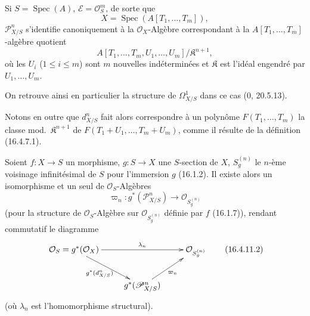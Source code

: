 \begin{corollary}[16.4.10]
\label{IV.16.4.10}
Si $S=\operatorname{Spec}(A)$, $\mathscr{E}=\mathcal{O}_S^m$, de sorte que
\[
  X=\operatorname{Spec}(A[T_1,\ldots,T_m]),
\]
$\mathscr{P}_{X/S}^n$ s'identifie canoniquement à la
$\mathcal{O}_X$-Algèbre correspondant à la $A[T_1,\ldots,T_m]$-algèbre quotient
\[
  A[T_1,\ldots,T_m,U_1,\ldots,U_m]/\mathfrak{K}^{n+1},
\]
où les $U_i$ ($1\leq i\leq m$) sont $m$ nouvelles indéterminées et
$\mathfrak{K}$ est l'idéal engendré par $U_1,\ldots,U_m$.
\end{corollary}

On retrouve ainsi en particulier la structure de $\Omega_{X/S}^1$ dans ce cas
(0, 20.5.13).

Notons en outre que $d_{X/S}^n$ fait alors correspondre à un polynôme
$F(T_1,\ldots,T_m)$ la classe mod.\ $\mathfrak{K}^{n+1}$ de
$F(T_1+U_1,\ldots,T_m+U_m)$, comme il résulte de la définition (16.4.7.1).

\begin{proposition}[16.4.11]
\label{IV.16.4.11}
Soient $f:X\to S$ un morphisme, $g:S\to X$ une $S$-section de $X$,
$S_g^{(n)}$ le $n$-ème voisinage infinitésimal de $S$ pour l'immersion $g$
(16.1.2). Il existe alors un isomorphisme et un seul de
$\mathcal{O}_S$-Algèbres
\[
  \varpi_n:g^*(\mathscr{P}_{X/S}^n)\longrightarrow
  \mathcal{O}_{S_g^{(n)}}
  \tag{16.4.11.1}
  \label{IV.16.4.11.1}
\]
(pour la structure de $\mathcal{O}_S$-Algèbre sur
$\mathcal{O}_{S_g^{(n)}}$ définie par $f$ (16.1.7)), rendant commutatif le
diagramme
\[
  \xymatrix{
    \mathcal{O}_S=g^*(\mathcal{O}_X)
      \ar[rr]^-{\lambda_n}\ar[dr]_-{g^*(d_{X/S}^n)}
      &&\mathcal{O}_{S_g^{(n)}}\\
    &g^*(\mathscr{P}_{X/S}^n)\ar[ur]_-{\varpi_n}
  }
  \tag{16.4.11.2}
  \label{IV.16.4.11.2}
\]
(où $\lambda_n$ est l'homomorphisme structural).
\end{proposition}

